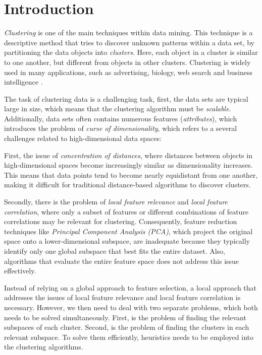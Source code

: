 \section{Introduction}
\textit{Clustering} is one of the main techniques within data mining. This technique is a descriptive method that tries to discover unknown patterns within a data set, by partitioning the data objects into \textit{clusters}. Here, each object in a cluster is similar to one another, but different from objects in other clusters. Clustering is widely used in many applications, such as advertising, biology, web search and business intelligence \cite[p.~444]{han-2011}.

The task of clustering data is a challenging task, first, the data sets are typical large in size, which means that the clustering algorithm must be \textit{scalable}. Additionally, data sets often contains numerous features (\textit{attributes}), which introduces the problem of \textit{curse of dimensionality}, which refers to a several challenges related to high-dimensional data spaces:

First, the issue of \textit{concentration of distances}, where distances between objects in high-dimensional spaces become increasingly similar as dimensionality increases. This means that data points tend to become nearly equidistant from one another, making it difficult for traditional distance-based algorithms to discover clusters.

Secondly, there is the problem of \textit{local feature relevance} and \textit{local feature correlation}, where only a subset of features or different combinations of feature correlations may be relevant for clustering. Consequently, feature reduction techniques like \textit{Principal Component Analysis (PCA)}, which project the original space onto a lower-dimensional subspace, are inadequate because they typically identify only one global subspace that best fits the entire dataset. Also, algorithms that evaluate the entire feature space does not address this issue effectively. \cite[p.~43--46]{kriegel-2009}

Instead of relying on a global approach to feature selection, a local approach that addresses the issues of local feature relevance and local feature correlation is necessary. However, we then need to deal with two separate problems, which both needs to be solved simultaneously. First, is the problem of finding the relevant subspaces of each cluster. Second, is the problem of finding the clusters in each relevant subspace. To solve them efficiently, heuristics needs to be employed into the clustering algorithms. \cite[p.~6--7]{kriegel-2009}

